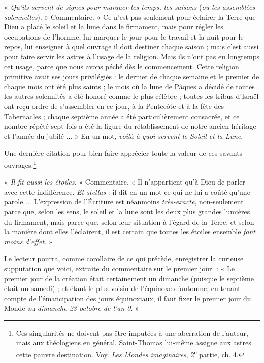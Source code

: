 \documentclass[a4paper, 11pt, oneside, landscape]{article}
\begin{document}
« \emph{Qu'ils servent de signes pour marquer les temps, les saisons} (\emph{ou les assemblées solennelles}). » Commentaire. « Ce n'est pas seulement pour éclairer la Terre que Dieu a placé le soleil et la lune dans le firmament, mais pour régler les occupations de l'homme, lui marquer le jour pour le travail et la nuit pour le repos, lui enseigner à quel ouvrage il doit destiner chaque saison ; mais c'est aussi pour faire servir les astres à l'usage de la religion. Mais ils n'ont pas eu longtemps cet usage, parce que nous avons péché dès le commencement. Cette religion primitive avait ses jours privilégiés : le dernier de chaque semaine et le premier de chaque mois ont été plus saints ; le mois où la lune de Pâques a décidé de toutes les autres solennités a été honoré comme le plus célèbre ; toutes les tribus d'Israël ont reçu ordre de s'assembler en ce jour, à la Pentecôte et à la fête des Tabernacles ; chaque septième année a été particulièrement consacrée, et ce nombre répété sept fois a été la figure du rétablissement de notre ancien héritage et l'année du jubilé ... » En un mot, \emph{voilà à quoi servent le Soleil et la Lune}.

Une dernière citation pour bien faire apprécier toute la valeur de ces savants ouvrages.\footnote{Ces singularités ne doivent pas être imputées à une aberration de l'auteur, mais aux théologiens en général. Saint-Thomas lui-même assigne aux astres cette pauvre destination. Voy. \emph{Les Mondes imaginaires}, 2\textsuperscript{e} partie, ch. 4.}

« \emph{Il fit aussi les étoiles.} » Commentaire. « Il n'appartient qu'à Dieu de parler avec cette indifférence. \emph{Et stellas} : il dit en un mot ce qui ne lui a coûté qu'une parole ... L'expression de l'Écriture est néanmoins \emph{très-exacte}, non-seulement parce que, selon les sens, le soleil et la lune sont les deux plus grandes lumières du firmament, mais parce que, selon leur situation à l'égard de la Terre, et selon la manière dont elles l'éclairent, il est certain que toutes les étoiles ensemble \emph{font moins d'effet}. »

Le lecteur pourra, comme corollaire de ce qui précède, enregistrer la curieuse supputation que voici, extraite du commentaire sur le premier jour. : « Le premier jour de la création était certainement un dimanche (puisque le septième était un samedi) ; et étant le plus voisin de l'équinoxe d'automne, en tenant compte de l'émancipation des jours équinoxiaux, il faut fixer le premier jour du Monde au \emph{dimanche 23 octobre de l'an 0}. »
\end{document}
